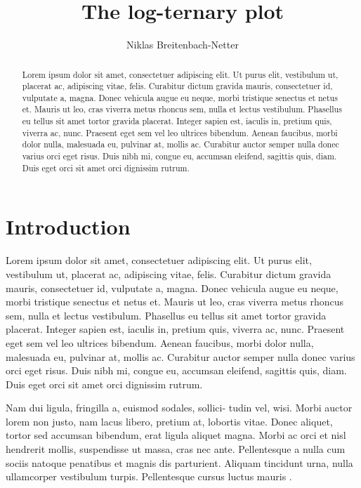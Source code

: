 \documentclass[twocolumn]{aastex631}
\begin{document}
\title{The log-ternary plot}

\author{Niklas Breitenbach-Netter}

\begin{abstract}
    Lorem ipsum dolor sit amet, consectetuer adipiscing elit.
    Ut purus elit, vestibulum ut, placerat ac, adipiscing vitae, felis.
    Curabitur dictum gravida mauris, consectetuer id, vulputate a, magna.
    Donec vehicula augue eu neque, morbi tristique senectus et netus et.
    Mauris ut leo, cras viverra metus rhoncus sem, nulla et lectus vestibulum.
    Phasellus eu tellus sit amet tortor gravida placerat.
    Integer sapien est, iaculis in, pretium quis, viverra ac, nunc.
    Praesent eget sem vel leo ultrices bibendum.
    Aenean faucibus, morbi dolor nulla, malesuada eu, pulvinar at, mollis ac.
    Curabitur auctor semper nulla donec varius orci eget risus.
    Duis nibh mi, congue eu, accumsan eleifend, sagittis quis, diam.
    Duis eget orci sit amet orci dignissim rutrum.
\end{abstract}

\section{Introduction}
\label{sec:intro}

Lorem ipsum dolor sit amet, consectetuer adipiscing elit.
Ut purus elit, vestibulum ut, placerat ac, adipiscing vitae, felis.
Curabitur dictum gravida mauris, consectetuer id, vulputate a, magna.
Donec vehicula augue eu neque, morbi tristique senectus et netus et.
Mauris ut leo, cras viverra metus rhoncus sem, nulla et lectus vestibulum.
Phasellus eu tellus sit amet tortor gravida placerat.
Integer sapien est, iaculis in, pretium quis, viverra ac, nunc.
Praesent eget sem vel leo ultrices bibendum.
Aenean faucibus, morbi dolor nulla, malesuada eu, pulvinar at, mollis ac.
Curabitur auctor semper nulla donec varius orci eget risus.
Duis nibh mi, congue eu, accumsan eleifend, sagittis quis, diam.
Duis eget orci sit amet orci dignissim rutrum.

Nam dui ligula, fringilla a, euismod sodales, sollici- tudin vel, wisi.
Morbi auctor lorem non justo, nam lacus libero, pretium at, lobortis vitae.
Donec aliquet, tortor sed accumsan bibendum, erat ligula aliquet magna.
Morbi ac orci et nisl hendrerit mollis, suspendisse ut massa, cras nec ante.
Pellentesque a nulla cum sociis natoque penatibus et magnis dis parturient.
Aliquam tincidunt urna, nulla ullamcorper vestibulum turpis.
Pellentesque cursus luctus mauris \citep{Luger2021}.


\end{document}
